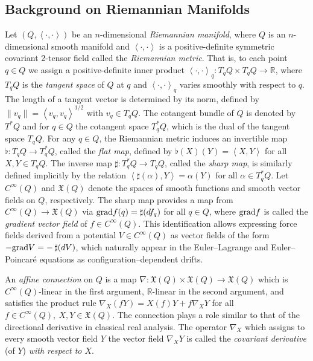 \documentclass[letterpaper, 10 pt, conference]{ieeeconf}
\newcommand{\R}{\mathbb{R}}
\newcommand{\grad}{\normalfont{\text{grad}}}
\begin{document}
\subsection{Background on Riemannian Manifolds}
Let $(Q, \left< \cdot, \cdot\right>)$ be an $n$-dimensional \textit{Riemannian
manifold}, where $Q$ is an $n$-dimensional smooth manifold and $\left< \cdot, \cdot \right>$ is a positive-definite symmetric covariant 2-tensor field called the \textit{Riemannian metric}. That is, to each point $q\in Q$ we assign a positive-definite inner product $\left<\cdot, \cdot\right>_q:T_qQ\times T_qQ\to\mathbb{R}$, where $T_qQ$ is the \textit{tangent space} of $Q$ at $q$ and $\left<\cdot, \cdot\right>_q$ varies smoothly with respect to $q$. The length of a tangent vector is determined by its norm, defined by
$\|v_q\|=\left<v_q,v_q\right>^{1/2}$ with $v_q\in T_qQ$.  The cotangent bundle of $Q$ is denoted by $T^*Q$ and for $q\in Q$ the cotangent space $T^*_qQ$, which is the dual of the tangent space $T_qQ$. For any $q \in Q$, the Riemannian metric induces an invertible map $\flat: T_q Q \to T_q^\ast Q$, called the \textit{flat map}, defined by $\flat(X)(Y) = \left<X, Y\right>$ for all $X, Y \in T_q Q$. The inverse map $\sharp: T_q^\ast Q \to T_q Q$, called the \textit{sharp map}, is similarly defined implicitly by the relation $\left<\sharp(\alpha), Y\right> = \alpha(Y)$ for all $\alpha \in T_q^\ast Q$. Let $C^{\infty}(Q)$ and $\mathfrak{X}(Q)$ denote the spaces of smooth functions and smooth vector fields on $Q$, respectively. The sharp map provides a map from $C^{\infty}(Q) \to \mathfrak{X}(Q)$ via $\grad f(q) = \sharp(df_q)$ for all $q \in Q$, where $\grad f$ is called the \textit{gradient vector field} of $f \in C^{\infty}(Q)$. This identification allows expressing force fields derived from a potential 
$V \in C^{\infty}(Q)$ as vector fields of the form $-\grad V = -\,\sharp(dV)$, 
which naturally appear in the Euler–Lagrange and Euler–Poincaré equations as 
configuration–dependent drifts.

An \textit{affine connection} on $Q$ is a map $\nabla: \mathfrak{X}(Q) \times \mathfrak{X}(Q) \to \mathfrak{X}(Q)$ which is $C^{\infty}(Q)$-linear in the first argument, $\R$-linear in the second argument, and satisfies the product rule $\nabla_X (fY) = X(f) Y + f \nabla_X Y$ for all $f \in C^{\infty}(Q), \ X, Y \in \mathfrak{X}(Q)$. The connection plays a role similar to that of the directional derivative in classical real analysis. The operator
$\nabla_{X}$ which assigns to every smooth vector field $Y$ the vector field $\nabla_{X}Y$ is called the \textit{covariant derivative} (of $Y$) \textit{with respect to $X$}.
\end{document}
